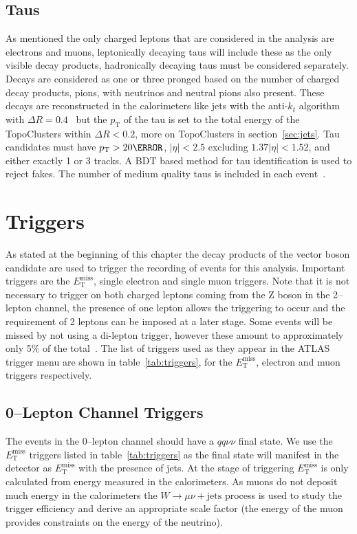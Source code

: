 \subsection{Taus}

As mentioned the only charged leptons that are considered in the analysis are
electrons and muons, leptonically decaying taus will include these as the only
visible decay products, hadronically decaying taus must be considered
separately. Decays are considered as one or three pronged based on the number of
charged decay products, pions, with neutrinos and neutral pions also present.
These decays are reconstructed in the calorimeters like jets with the anti-$k_t$
algorithm with $\Delta R = 0.4$~\cite{ATL-PHYS-PUB-2015-045} but the $p_{\mathrm{T}}$ of
the tau is set to the total energy of the TopoClusters within $\Delta R < 0.2$,
more on TopoClusters in section~\ref{sec:jets}. Tau candidates must have $p_{\mathrm{T}} >
20 \GeV$, $\lvert  \eta \rvert < 2.5$ excluding $1.37 \lvert \eta \rvert <
1.52$, and either exactly 1 or 3 tracks. A BDT based method for tau
identification is used to reject fakes. The number of medium quality taus is
included in each event~\cite{TauRecommendation2015,TauRecommendation2016}.

\section{Triggers}
\label{sec:triggers}

As stated at the beginning of this chapter the decay products of the vector
boson candidate are used to trigger the recording of events for this analysis.
Important triggers are the $E_{\mathrm{T}}^{\text{miss}}$, single electron and single muon
triggers. Note that it is not necessary to trigger on both charged leptons
coming from the Z boson in the 2--lepton channel, the presence of one lepton
allows the triggering to occur and the requirement of 2 leptons can be imposed
at a later stage. Some events will be missed by not using a di-lepton trigger,
however these amount to approximately only 5\% of the
total~\cite{VHObjectNote2019}. The list of triggers used as they appear in the
ATLAS trigger menu are shown in table~\ref{tab:triggers}, for the
$E_{\mathrm{T}}^{\text{miss}}$, electron and muon triggers respectively.


\subsection{0--Lepton Channel Triggers}
The events in the 0--lepton channel should have a $qq\nu\nu$ final state. We use
the $E_{\mathrm{T}}^{\text{miss}}$ triggers listed in table~\ref{tab:triggers} as the final
state will manifest in the detector as $E_{\mathrm{T}}^{\text{miss}}$ with the presence of
jets. At the stage of triggering $E_{\mathrm{T}}^{\text{miss}}$ is only calculated from
energy measured in the calorimeters. As muons do not deposit much energy in the
calorimeters the $W \to \mu \nu + \text{jets}$ process is used to study the
trigger efficiency and derive an appropriate scale factor (the energy of the
muon provides constraints on the energy of the neutrino).

